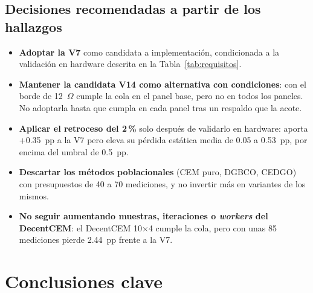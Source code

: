 \documentclass[letterpaper,11pt]{article}
\begin{document}
\subsection{Decisiones recomendadas a partir de los hallazgos}
\begin{itemize}[leftmargin=1.5em, itemsep=2pt]
  \item \textbf{Adoptar la V7} como candidata a implementación, condicionada a la validación en hardware descrita en la Tabla~\ref{tab:requisitos}.
  \item \textbf{Mantener la candidata V14 como alternativa con condiciones}: con el borde de 12~$\Omega$ cumple la cola en el panel base, pero no en todos los paneles. No adoptarla hasta que cumpla en cada panel tras un respaldo que la acote.
  \item \textbf{Aplicar el retroceso del 2\,\%} solo después de validarlo en hardware: aporta +0.35~pp a la V7 pero eleva su pérdida estática media de 0.05 a 0.53~pp, por encima del umbral de 0.5~pp.
  \item \textbf{Descartar los métodos poblacionales} (CEM puro, DGBCO, CEDGO) con presupuestos de 40 a 70 mediciones, y no invertir más en variantes de los mismos.
  \item \textbf{No seguir aumentando muestras, iteraciones o \textit{workers} del DecentCEM}: el DecentCEM 10$\times$4 cumple la cola, pero con unas 85 mediciones pierde 2.44~pp frente a la V7.
\end{itemize}

\section{Conclusiones clave}
\end{document}
